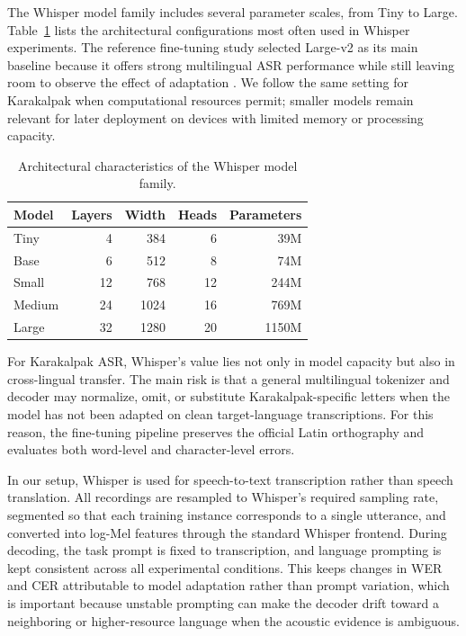\documentclass[11pt]{article}
\begin{document}
The Whisper model family includes several parameter scales, from Tiny to Large. Table~\ref{tab:whisper-family} lists the architectural configurations most often used in Whisper experiments. The reference fine-tuning study selected Large-v2 as its main baseline because it offers strong multilingual ASR performance while still leaving room to observe the effect of adaptation \cite{liu2024exploration}. We follow the same setting for Karakalpak when computational resources permit; smaller models remain relevant for later deployment on devices with limited memory or processing capacity.

\begin{table}[H]
\centering
\caption{Architectural characteristics of the Whisper model family.}
\label{tab:whisper-family}
\begin{tabular}{lrrrr}
\toprule
Model & Layers & Width & Heads & Parameters \\
\midrule
Tiny & 4 & 384 & 6 & 39M \\
Base & 6 & 512 & 8 & 74M \\
Small & 12 & 768 & 12 & 244M \\
Medium & 24 & 1024 & 16 & 769M \\
Large & 32 & 1280 & 20 & 1150M \\
\bottomrule
\end{tabular}
\end{table}

For Karakalpak ASR, Whisper's value lies not only in model capacity but also in cross-lingual transfer. The main risk is that a general multilingual tokenizer and decoder may normalize, omit, or substitute Karakalpak-specific letters when the model has not been adapted on clean target-language transcriptions. For this reason, the fine-tuning pipeline preserves the official Latin orthography and evaluates both word-level and character-level errors.

In our setup, Whisper is used for speech-to-text transcription rather than speech translation. All recordings are resampled to Whisper's required sampling rate, segmented so that each training instance corresponds to a single utterance, and converted into log-Mel features through the standard Whisper frontend. During decoding, the task prompt is fixed to transcription, and language prompting is kept consistent across all experimental conditions. This keeps changes in WER and CER attributable to model adaptation rather than prompt variation, which is important because unstable prompting can make the decoder drift toward a neighboring or higher-resource language when the acoustic evidence is ambiguous.
\end{document}
